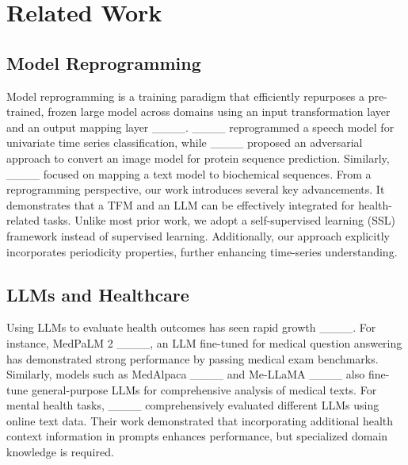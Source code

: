 \section{Related Work}
\subsection{Model Reprogramming}

Model reprogramming is a training paradigm that efficiently repurposes a pre-trained, frozen large model across domains using an input transformation layer and an output mapping layer ____. ____ reprogrammed a speech model for univariate time series classification, while ____ proposed an adversarial approach to convert an image model for protein sequence prediction. Similarly, ____ focused on mapping a text model to biochemical sequences. From a reprogramming perspective, our work introduces several key advancements. It demonstrates that a TFM and an LLM can be effectively integrated for health-related tasks. Unlike most prior work, we adopt a self-supervised learning (SSL) framework instead of supervised learning. Additionally, our approach explicitly incorporates periodicity properties, further enhancing time-series understanding.



\subsection{LLMs and Healthcare}
Using LLMs to evaluate health outcomes has seen rapid growth ____. For instance, MedPaLM 2 ____, an LLM fine-tuned for medical question answering has demonstrated strong performance by passing medical exam benchmarks. Similarly, models such as MedAlpaca ____ and Me-LLaMA ____ also fine-tune general-purpose LLMs for comprehensive analysis of medical texts. For mental health tasks, ____ comprehensively evaluated different LLMs using online text data. Their work demonstrated that incorporating additional health context information in prompts enhances performance, but specialized domain knowledge is required.

